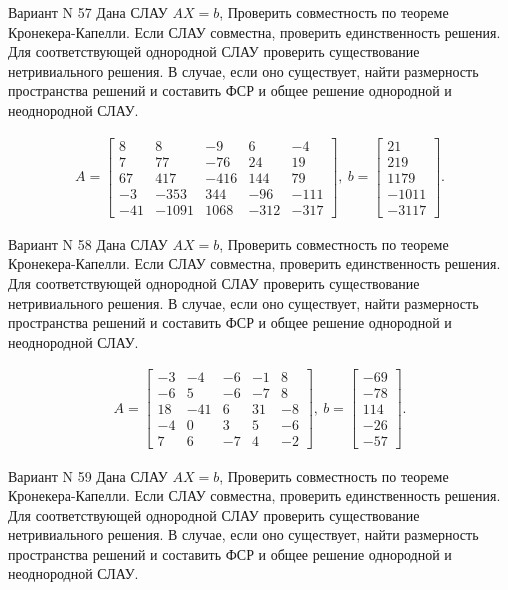 \documentclass[11pt]{report}
\begin{document}
Вариант N 57
Дана СЛАУ $AX = b$,
Проверить совместность по теореме Кронекера-Капелли. Если СЛАУ совместна, проверить единственность решения.
Для соответствующей однородной СЛАУ проверить существование нетривиального решения. В случае, если оно существует,
найти размерность пространства решений и составить ФСР и общее решение однородной  и неоднородной СЛАУ.


\begin{align*}
 A = \left[\begin{matrix}8 & 8 & -9 & 6 & -4\\7 & 77 & -76 & 24 & 19\\67 & 417 & -416 & 144 & 79\\-3 & -353 & 344 & -96 & -111\\-41 & -1091 & 1068 & -312 & -317\end{matrix}\right],
\ b = \left[\begin{matrix}21\\219\\1179\\-1011\\-3117\end{matrix}\right]. 
 \end{align*}

Вариант N 58
Дана СЛАУ $AX = b$,
Проверить совместность по теореме Кронекера-Капелли. Если СЛАУ совместна, проверить единственность решения.
Для соответствующей однородной СЛАУ проверить существование нетривиального решения. В случае, если оно существует,
найти размерность пространства решений и составить ФСР и общее решение однородной  и неоднородной СЛАУ.


\begin{align*}
 A = \left[\begin{matrix}-3 & -4 & -6 & -1 & 8\\-6 & 5 & -6 & -7 & 8\\18 & -41 & 6 & 31 & -8\\-4 & 0 & 3 & 5 & -6\\7 & 6 & -7 & 4 & -2\end{matrix}\right],
\ b = \left[\begin{matrix}-69\\-78\\114\\-26\\-57\end{matrix}\right]. 
 \end{align*}

Вариант N 59
Дана СЛАУ $AX = b$,
Проверить совместность по теореме Кронекера-Капелли. Если СЛАУ совместна, проверить единственность решения.
Для соответствующей однородной СЛАУ проверить существование нетривиального решения. В случае, если оно существует,
найти размерность пространства решений и составить ФСР и общее решение однородной  и неоднородной СЛАУ.
\end{document}
